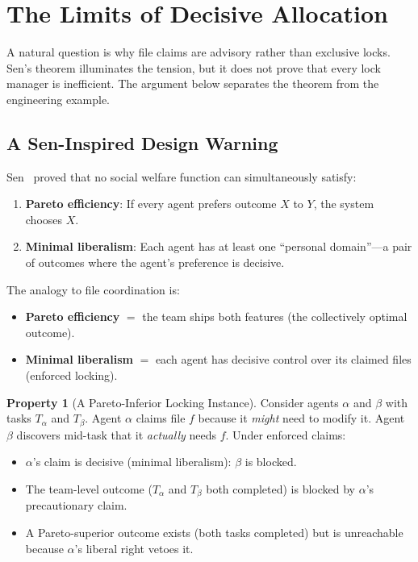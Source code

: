 \documentclass[11pt,a4paper]{article}
\theoremstyle{definition}
\newtheorem{property}{Property}[section]
\theoremstyle{remark}
\begin{document}
\section{The Limits of Decisive Allocation}\label{sec:sen}

A natural question is why file claims are advisory rather than exclusive locks. Sen's theorem illuminates the tension, but it does not prove that every lock manager is inefficient. The argument below separates the theorem from the engineering example.

\subsection{A Sen-Inspired Design Warning}

Sen~\cite{sen1970impossibility} proved that no social welfare function can simultaneously satisfy:
\begin{enumerate}[nosep]
  \item \textbf{Pareto efficiency}: If every agent prefers outcome $X$ to $Y$, the system chooses $X$.
  \item \textbf{Minimal liberalism}: Each agent has at least one ``personal domain''---a pair of outcomes where the agent's preference is decisive.
\end{enumerate}

The analogy to file coordination is:

\begin{itemize}[nosep]
  \item \textbf{Pareto efficiency} $=$ the team ships both features (the collectively optimal outcome).
  \item \textbf{Minimal liberalism} $=$ each agent has decisive control over its claimed files (enforced locking).
\end{itemize}

\begin{property}[A Pareto-Inferior Locking Instance]\label{prop:sen}
Consider agents $\alpha$ and $\beta$ with tasks $T_\alpha$ and $T_\beta$. Agent $\alpha$ claims file $f$ because it \emph{might} need to modify it. Agent $\beta$ discovers mid-task that it \emph{actually} needs $f$. Under enforced claims:
\begin{itemize}[nosep]
  \item $\alpha$'s claim is decisive (minimal liberalism): $\beta$ is blocked.
  \item The team-level outcome ($T_\alpha$ and $T_\beta$ both completed) is blocked by $\alpha$'s precautionary claim.
  \item A Pareto-superior outcome exists (both tasks completed) but is unreachable because $\alpha$'s liberal right vetoes it.
\end{itemize}
\end{property}
\end{document}

